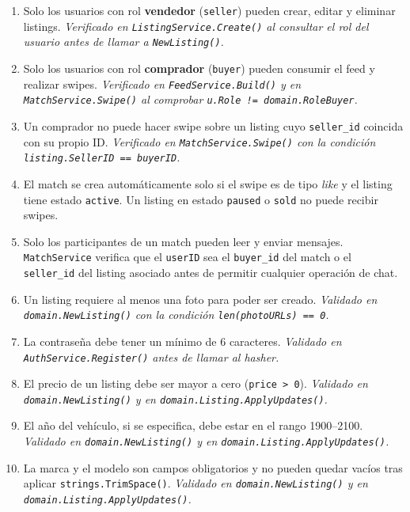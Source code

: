 \documentclass[12pt,a4paper]{article}
\begin{document}
\begin{enumerate}
  \item Solo los usuarios con rol \textbf{vendedor} (\texttt{seller}) pueden crear, editar y
        eliminar listings. \textit{Verificado en \texttt{ListingService.Create()} al consultar el
        rol del usuario antes de llamar a \texttt{NewListing()}.}

  \item Solo los usuarios con rol \textbf{comprador} (\texttt{buyer}) pueden consumir el feed y
        realizar swipes. \textit{Verificado en \texttt{FeedService.Build()} y en
        \texttt{MatchService.Swipe()} al comprobar \texttt{u.Role != domain.RoleBuyer}.}

  \item Un comprador no puede hacer swipe sobre un listing cuyo \texttt{seller\_id} coincida con
        su propio ID. \textit{Verificado en \texttt{MatchService.Swipe()} con la condición
        \texttt{listing.SellerID == buyerID}.}

  \item El match se crea automáticamente solo si el swipe es de tipo \emph{like} y el listing
        tiene estado \texttt{active}. Un listing en estado \texttt{paused} o \texttt{sold} no
        puede recibir swipes.
  \item Solo los participantes de un match pueden leer y enviar mensajes. \texttt{MatchService}
        verifica que el \texttt{userID} sea el \texttt{buyer\_id} del match o el
        \texttt{seller\_id} del listing asociado antes de permitir cualquier operación de chat.
  \item Un listing requiere al menos una foto para poder ser creado. \textit{Validado en
        \texttt{domain.NewListing()} con la condición \texttt{len(photoURLs) == 0}.}

  \item La contraseña debe tener un mínimo de 6 caracteres. \textit{Validado en
        \texttt{AuthService.Register()} antes de llamar al hasher.}

  \item El precio de un listing debe ser mayor a cero (\texttt{price > 0}). \textit{Validado en
        \texttt{domain.NewListing()} y en \texttt{domain.Listing.ApplyUpdates()}.}

  \item El año del vehículo, si se especifica, debe estar en el rango 1900--2100. \textit{Validado
        en \texttt{domain.NewListing()} y en \texttt{domain.Listing.ApplyUpdates()}.}

  \item La marca y el modelo son campos obligatorios y no pueden quedar vacíos tras aplicar
        \texttt{strings.TrimSpace()}. \textit{Validado en \texttt{domain.NewListing()} y en
        \texttt{domain.Listing.ApplyUpdates()}.}
\end{enumerate}
\end{document}
